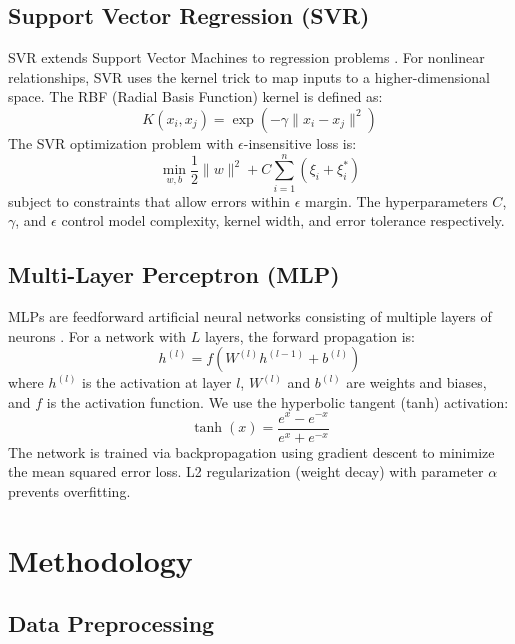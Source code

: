 \documentclass[conference]{IEEEtran}
\begin{document}
\subsection{Support Vector Regression (SVR)}
SVR extends Support Vector Machines to regression problems \cite{svr}. For nonlinear relationships, SVR uses the kernel trick to map inputs to a higher-dimensional space. The RBF (Radial Basis Function) kernel is defined as:
\begin{equation}
    K(x_i, x_j) = \exp(-\gamma \|x_i - x_j\|^2)
\end{equation}
The SVR optimization problem with $\epsilon$-insensitive loss is:
\begin{equation}
    \min_{w,b} \frac{1}{2}\|w\|^2 + C \sum_{i=1}^{n} (\xi_i + \xi_i^*)
\end{equation}
subject to constraints that allow errors within $\epsilon$ margin. The hyperparameters $C$, $\gamma$, and $\epsilon$ control model complexity, kernel width, and error tolerance respectively.

\subsection{Multi-Layer Perceptron (MLP)}
MLPs are feedforward artificial neural networks consisting of multiple layers of neurons \cite{mlp}. For a network with $L$ layers, the forward propagation is:
\begin{equation}
    h^{(l)} = f(W^{(l)} h^{(l-1)} + b^{(l)})
\end{equation}
where $h^{(l)}$ is the activation at layer $l$, $W^{(l)}$ and $b^{(l)}$ are weights and biases, and $f$ is the activation function. We use the hyperbolic tangent (tanh) activation:
\begin{equation}
    \tanh(x) = \frac{e^x - e^{-x}}{e^x + e^{-x}}
\end{equation}
The network is trained via backpropagation using gradient descent to minimize the mean squared error loss. L2 regularization (weight decay) with parameter $\alpha$ prevents overfitting.

\section{Methodology}
\label{methodology}

\subsection{Data Preprocessing}
\end{document}
